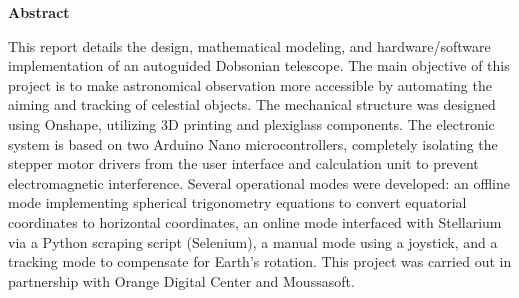 \documentclass[12pt,a4paper]{report}
\begin{document}

\vspace{2cm}

\begin{center}
\textbf{Abstract}
\end{center}
This report details the design, mathematical modeling, and hardware/software implementation of an autoguided Dobsonian telescope. The main objective of this project is to make astronomical observation more accessible by automating the aiming and tracking of celestial objects. The mechanical structure was designed using Onshape, utilizing 3D printing and plexiglass components. The electronic system is based on two Arduino Nano microcontrollers, completely isolating the stepper motor drivers from the user interface and calculation unit to prevent electromagnetic interference.
Several operational modes were developed: an offline mode implementing spherical trigonometry equations to convert equatorial coordinates to horizontal coordinates, an online mode interfaced with Stellarium via a Python scraping script (Selenium), a manual mode using a joystick, and a tracking mode to compensate for Earth's rotation. This project was carried out in partnership with Orange Digital Center and Moussasoft.


\clearpage

\end{document}
